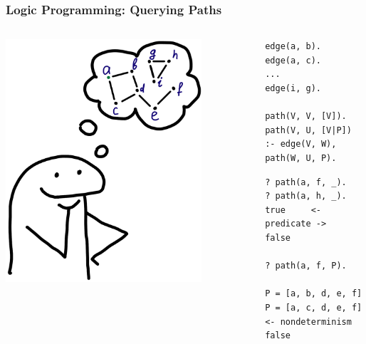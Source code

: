\documentclass[xcolor={dvipsnames}, aspectratio=169]{beamer}
\begin{document}
\begin{frame}[fragile]
  \frametitle{Logic Programming: Querying Paths}
  \begin{columns}    
    \begin{column}{0.35\textwidth}
      \centering
      \includegraphics[width=0.8\textwidth]{pic/graph.jpg}
    \end{column}
    \begin{column}{0.75\textwidth} 

\begin{center}
  \begin{minipage}{0.82\textwidth}
    \begin{lstlisting}[language=logic]
edge(a, b).
edge(a, c).
...
edge(i, g).

path(V, V, [V]). 
path(V, U, [V|P]) :- edge(V, W), path(W, U, P).
    \end{lstlisting}

    \begin{lstlisting}[language=query,basicstyle=\footnotesize]
? path(a, f, _).             ? path(a, h, _).
true     <- predicate ->     false 
                              
? path(a, f, P).              

P = [a, b, d, e, f]      
P = [a, c, d, e, f]      <- nondeterminism
false 
    \end{lstlisting}
  \end{minipage}
\end{center}

      \end{column}
    \end{columns}
\end{frame}
\end{document}
